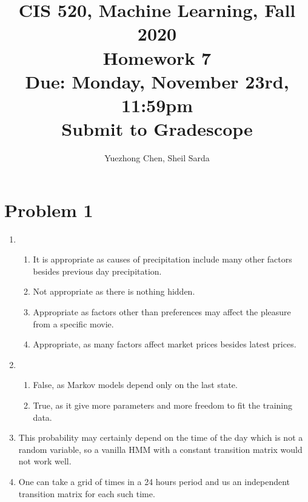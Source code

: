 \documentclass[english]{article}
\title{CIS 520, Machine Learning, Fall 2020 \\ Homework 7\\
Due: Monday, November 23rd, 11:59pm \\
Submit to Gradescope}
\date{}
\author{Yuezhong Chen, Sheil Sarda}
\begin{document}
\maketitle

\section*{Problem 1}
\begin{enumerate}
    \item 
    \begin{enumerate}
        \item It is appropriate as causes of precipitation include many other factors besides previous day precipitation.
        \item Not appropriate as there is nothing hidden.
        \item Appropriate as factors other than preferences may affect the pleasure from a specific movie.
        \item Appropriate, as many factors affect market prices besides latest prices.
    \end{enumerate}
    \item
    \begin{enumerate}
        \item False, as Markov models depend only on the last state.
        \item True, as it give more parameters and more freedom to fit the training data.
    \end{enumerate}
    \item This probability may certainly depend on the time of the day which is not a random variable, so a vanilla HMM with a constant transition matrix would not work well.
    \item One can take a grid of times in a 24 hours period and us an independent transition matrix for each such time.
\end{enumerate}
\end{document}
